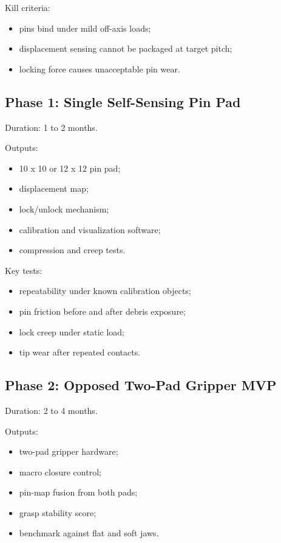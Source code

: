 \documentclass[11pt]{article}
\begin{document}
Kill criteria:

\begin{itemize}[leftmargin=*]
  \item pins bind under mild off-axis loads;
  \item displacement sensing cannot be packaged at target pitch;
  \item locking force causes unacceptable pin wear.
\end{itemize}

\subsection{Phase 1: Single Self-Sensing Pin Pad}

Duration: 1 to 2 months.

Outputs:

\begin{itemize}[leftmargin=*]
  \item 10 x 10 or 12 x 12 pin pad;
  \item displacement map;
  \item lock/unlock mechanism;
  \item calibration and visualization software;
  \item compression and creep tests.
\end{itemize}

Key tests:

\begin{itemize}[leftmargin=*]
  \item repeatability under known calibration objects;
  \item pin friction before and after debris exposure;
  \item lock creep under static load;
  \item tip wear after repeated contacts.
\end{itemize}

\subsection{Phase 2: Opposed Two-Pad Gripper MVP}

Duration: 2 to 4 months.

Outputs:

\begin{itemize}[leftmargin=*]
  \item two-pad gripper hardware;
  \item macro closure control;
  \item pin-map fusion from both pads;
  \item grasp stability score;
  \item benchmark against flat and soft jaws.
\end{itemize}
\end{document}

